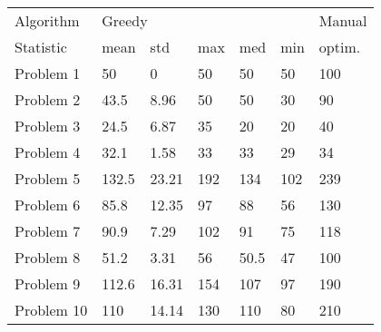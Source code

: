 \begin{tabular}{lllllll}
\toprule
Algorithm & \multicolumn{5}{l}{Greedy} & Manual \\
Statistic &   mean &    std &  max &   med &  min & optim. \\
\midrule
Problem 1  &     50 &      0 &   50 &    50 &   50 &    100 \\
Problem 2  &   43.5 &   8.96 &   50 &    50 &   30 &     90 \\
Problem 3  &   24.5 &   6.87 &   35 &    20 &   20 &     40 \\
Problem 4  &   32.1 &   1.58 &   33 &    33 &   29 &     34 \\
Problem 5  &  132.5 &  23.21 &  192 &   134 &  102 &    239 \\
Problem 6  &   85.8 &  12.35 &   97 &    88 &   56 &    130 \\
Problem 7  &   90.9 &   7.29 &  102 &    91 &   75 &    118 \\
Problem 8  &   51.2 &   3.31 &   56 &  50.5 &   47 &    100 \\
Problem 9  &  112.6 &  16.31 &  154 &   107 &   97 &    190 \\
Problem 10 &    110 &  14.14 &  130 &   110 &   80 &    210 \\
\bottomrule
\end{tabular}
